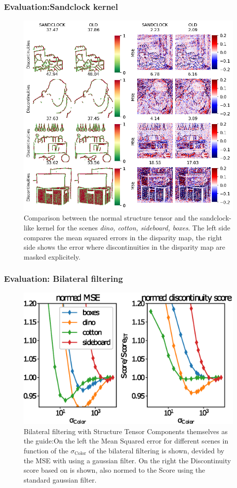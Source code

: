 \documentclass[11pt]{beamer}
\begin{document}
\begin{frame}
\frametitle{Evaluation:Sandclock kernel}
\begin{figure}
	\centering
	\includegraphics[width=0.7\linewidth]{images/sandclock_results}
	\caption[Results with custom sized kernel]{Comparison between the normal structure tensor and the sandclock- like kernel for the scenes \textit{dino, cotton, sideboard, boxes}. The left side compares the mean squared errors in the disparity map, the right side shows the error where discontinuities in the disparity map are masked explicitely.}
	\label{fig:sandclockresults}
\end{figure}
\end{frame}

\begin{frame}
\frametitle{Evaluation: Bilateral filtering}
\begin{figure}
	\centering
	\includegraphics[width=0.7\linewidth]{images/bilateral_norm_params}
	\caption[Parameter dependency for bilateral filtering]{Bilateral filtering with Structure Tensor Components themselves as the guide:On the left the Mean Squared error for different scenes in function of the $\sigma_\text{Color}$ of the bilateral filtering is shown, devided by the MSE with using a gaussian filter. On the right the Discontinuity score based on \cite{honauer2016benchmark} is shown, also normed to the Score using the standard gaussian filter.}
	\label{fig:bilateralnormparams}
\end{figure}
\end{frame}
\end{document}
